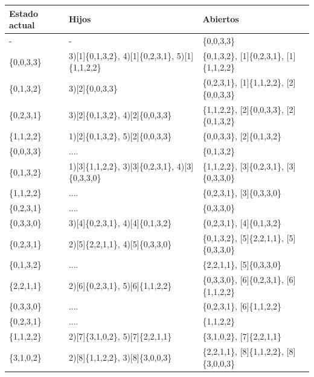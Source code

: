 \documentclass{article}
\begin{document}
\begin{center}
  \begin{longtable}{ |p{2cm}|p{2cm}|>{\raggedright\arraybackslash}p{7cm}|  }
    \hline
    Estado actual & Hijos & Abiertos \\ [0.5ex] 
    \hline\hline
    
    - & - & [0]\{0,0,3,3\} \\ 
    \hline
    [0]\{0,0,3,3\} & 3)[1]\{0,1,3,2\}, 4)[1]\{0,2,3,1\}, 5)[1]\{1,1,2,2\} & [1]\{0,1,3,2\}, [1]\{0,2,3,1\}, [1]\{1,1,2,2\} \\ 
    \hline
    [1]\{0,1,3,2\} & 3)[2]\{0,0,3,3\} & [1]\{0,2,3,1\}, [1]\{1,1,2,2\}, [2]\{0,0,3,3\} \\ 
    \hline
    [1]\{0,2,3,1\} & 3)[2]\{0,1,3,2\}, 4)[2]\{0,0,3,3\} & [1]\{1,1,2,2\}, [2]\{0,0,3,3\}, [2]\{0,1,3,2\} \\ 
    \hline
    [1]\{1,1,2,2\} & 1)[2]\{0,1,3,2\}, 5)[2]\{0,0,3,3\} & [2]\{0,0,3,3\}, [2]\{0,1,3,2\} \\ 
    \hline
    [2]\{0,0,3,3\} & .... & [2]\{0,1,3,2\} \\ 
    \hline
    [2]\{0,1,3,2\} & 1)[3]\{1,1,2,2\}, 3)[3]\{0,2,3,1\}, 4)[3]\{0,3,3,0\} & [3]\{1,1,2,2\}, [3]\{0,2,3,1\}, [3]\{0,3,3,0\} \\ 
    \hline
    [3]\{1,1,2,2\} & .... & [3]\{0,2,3,1\}, [3]\{0,3,3,0\} \\ 
    \hline
    [3]\{0,2,3,1\} & .... & [3]\{0,3,3,0\} \\ 
    \hline
    [3]\{0,3,3,0\} & 3)[4]\{0,2,3,1\}, 4)[4]\{0,1,3,2\} & [4]\{0,2,3,1\}, [4]\{0,1,3,2\} \\ 
    \hline
    [4]\{0,2,3,1\} & 2)[5]\{2,2,1,1\}, 4)[5]\{0,3,3,0\} & [4]\{0,1,3,2\}, [5]\{2,2,1,1\}, [5]\{0,3,3,0\} \\ 
    \hline
    [4]\{0,1,3,2\} & .... & [5]\{2,2,1,1\}, [5]\{0,3,3,0\} \\ 
    \hline
    [5]\{2,2,1,1\} & 2)[6]\{0,2,3,1\}, 5)[6]\{1,1,2,2\} & [5]\{0,3,3,0\}, [6]\{0,2,3,1\}, [6]\{1,1,2,2\} \\ 
    \hline
    [5]\{0,3,3,0\} & .... & [6]\{0,2,3,1\}, [6]\{1,1,2,2\} \\ 
    \hline
    [6]\{0,2,3,1\} & .... & [6]\{1,1,2,2\} \\ 
    \hline
    [6]\{1,1,2,2\} & 2)[7]\{3,1,0,2\}, 5)[7]\{2,2,1,1\} & [7]\{3,1,0,2\}, [7]\{2,2,1,1\} \\ 
    \hline
    [7]\{3,1,0,2\} & 2)[8]\{1,1,2,2\}, 3)[8]\{3,0,0,3\} & [7]\{2,2,1,1\}, [8]\{1,1,2,2\}, [8]\{3,0,0,3\} \\ 

\end{longtable}
\end{center}
\end{document}
